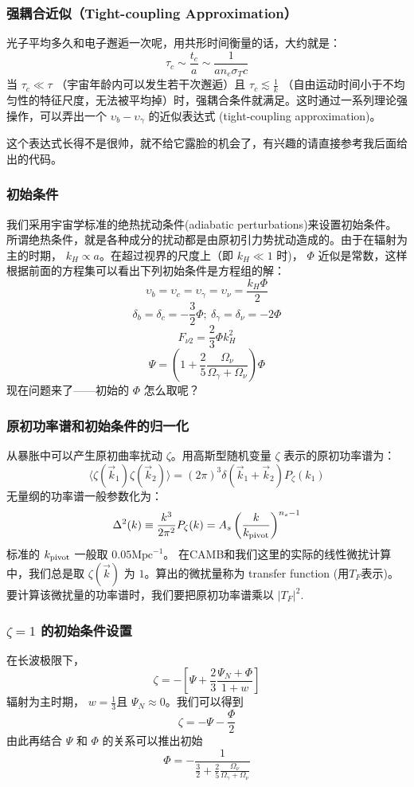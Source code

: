 \documentclass[CJK,13pt]{beamer}
\begin{document}
    \begin{frame}
      \frametitle{强耦合近似（Tight-coupling Approximation）}
      光子平均多久和电子邂逅一次呢，用共形时间衡量的话，大约就是：
      $$\tau_c \sim \frac{t_c}{a} \sim \frac{1}{a n_e\sigma_Tc} $$
      当 $\tau_c \ll \tau $ （宇宙年龄内可以发生若干次邂逅）且 $\tau_c \lesssim \frac{1}{k}$ （自由运动时间小于不均匀性的特征尺度，无法被平均掉）时，强耦合条件就满足。这时通过一系列理论强操作，可以弄出一个 $\upsilon_b - \upsilon_\gamma$  的近似表达式 (tight-coupling approximation)。


      
      这个表达式长得不是很帅，就不给它露脸的机会了，有兴趣的请直接参考我后面给出的代码。
    \end{frame}    

    
    \begin{frame}
      \frametitle{初始条件}
      我们采用宇宙学标准的绝热扰动条件(adiabatic perturbations)来设置初始条件。所谓绝热条件，就是各种成分的扰动都是由原初引力势扰动造成的。由于在辐射为主的时期， $k_H\propto a$。在超过视界的尺度上（即 $k_H\ll 1$ 时)， $\Phi$ 近似是常数，这样根据前面的方程集可以看出下列初始条件是方程组的解：
        $$ \upsilon_{b}=  \upsilon_{c}= \upsilon_{\gamma}= \upsilon_{\nu} = \frac{k_H\Phi}{2}$$
        $$\delta_b = \delta_c = -\frac{3}{2}\Phi;\ \delta_\gamma = \delta_\nu = -2\Phi$$
        $$F_{\nu 2} = \frac{2}{3}\Phi k_H^2 $$
        $$\Psi = \left(1 + \frac{2}{5}\frac{\Omega_\nu}{\Omega_\gamma+\Omega_\nu}\right)\Phi $$
        现在问题来了——初始的 $\Phi$ 怎么取呢？
    \end{frame}    


    \begin{frame}
      \frametitle{原初功率谱和初始条件的归一化}
      从暴胀中可以产生原初曲率扰动 $\zeta$。用高斯型随机变量 $\zeta$ 表示的原初功率谱为：
      $$\langle \zeta(\vec{k}_1) \zeta(\vec{k}_2)\rangle = (2\pi)^3\delta(\vec{k}_1+\vec{k}_2)P_\zeta(k_1)$$
      无量纲的功率谱一般参数化为：
      $$\Delta^2(k)\equiv \frac{k^3}{2\pi^2}P_\zeta(k) = A_s\left(\frac{k}{k_{\rm pivot}}\right)^{n_s-1}$$
     标准的 $k_{\rm pivot}$ 一般取 $0.05\mathrm{Mpc}^{-1}$。 在CAMB和我们这里的实际的线性微扰计算中，我们总是取 $\zeta(\vec{k})$ 为 $1$。算出的微扰量称为 transfer function (用$T_F$表示)。要计算该微扰量的功率谱时，我们要把原初功率谱乘以 $|T_F|^2$.
    \end{frame}

    \begin{frame}
      \frametitle{$\zeta=1$ 的初始条件设置}
      在长波极限下，
      $$\zeta = -\left[\Psi+\frac{2}{3}\frac{\Psi_N+\Phi}{1+w}\right]$$
      辐射为主时期， $w=\frac{1}{3}$且 $\Psi_N\approx 0$。我们可以得到
      $$\zeta = -\Psi - \frac{\Phi}{2}$$
      由此再结合 $\Psi $ 和 $\Phi$ 的关系可以推出初始
      $$\Phi = -\frac{1}{\frac{3}{2}+\frac{2}{5}\frac{\Omega_\nu}{\Omega_\gamma+\Omega_\nu}}$$
    \end{frame}    
    
\end{document}
